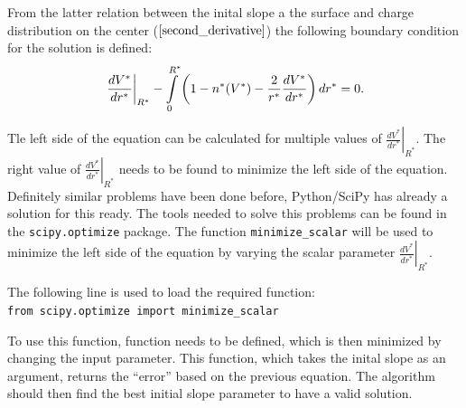 \documentclass[11pt]{article}
\begin{document}
    From the latter relation between the inital slope a the surface and
charge distribution on the center (\(\ref{second_derivative}\)) the
following boundary condition for the solution is defined: \begin{align}
\left.\frac{dV^*}{dr^{*}}\right|_{R^*}-\intop_{0}^{R^*}\left(1-n^{*}(V^{*})-\frac{2}{r^{*}}\frac{dV^{*}}{dr^{*}}\right)dr^* = 0.
\end{align}

Tle left side of the equation can be calculated for multiple values of
\(\left.\frac{dV^*}{dr^{*}}\right|_{R^*}\). The right value of
\(\left.\frac{dV^*}{dr^{*}}\right|_{R^*}\) needs to be found to minimize
the left side of the equation. Definitely similar problems have been
done before, Python/SciPy has already a solution for this ready. The
tools needed to solve this problems can be found in the
\texttt{scipy.optimize} package. The function \texttt{minimize\_scalar}
will be used to minimize the left side of the equation by varying the
scalar parameter \(\left.\frac{dV^*}{dr^{*}}\right|_{R^*}\).

The following line is used to load the required function:
\texttt{from\ scipy.optimize\ import\ minimize\_scalar}

To use this function, function needs to be defined, which is then
minimized by changing the input parameter. This function, which takes
the inital slope as an argument, returns the ``error'' based on the
previous equation. The algorithm should then find the best initial slope
parameter to have a valid solution.
\end{document}
